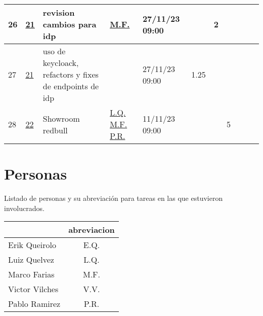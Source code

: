 \documentclass{article}
\begin{document}
\begin{longtable}{|m{0.5cm}|m{1.2cm}|p{5cm}|m{1.5cm}|m{1.5cm}||c|c|c|c|c|c|    |}
                 \label{26}26  &  \hyperref[21]{\color{blue}21}  & revision cambios para idp &  
                  \hyperref[M.F.]{\color{blue}M.F.}  & 27/11/23 09:00  &  & 2 &  &  &  & \\ \hline 

                 \label{27}27  &  \hyperref[21]{\color{blue}21}  & uso de keycloack, refactors y fixes de endpoints de idp &  
                 & 27/11/23 09:00  & 1.25 &  &  &  &  & \\ \hline 

                 \label{28}28  &  \hyperref[22]{\color{blue}22}  & Showroom redbull &  
                  \hyperref[L.Q.]{\color{blue}L.Q.} \newline  \hyperref[M.F.]{\color{blue}M.F.} \newline  \hyperref[P.R.]{\color{blue}P.R.}  & 11/11/23 09:00  &  &  & 5 &  &  & \\ \hline 

    \end{longtable} 
 \newpage
\section{Personas}
Listado de personas y su abreviación para tareas en las que estuvieron involucrados.
\begin{table}[htbp]
    \centering
    \begin{tabular}{|p{6cm}|c|}
        \hline
        \centering{\textbf{Nombre}} & \textbf{abreviacion} \\ \hline
        Erik Queirolo &  \label{E.Q.}E.Q.  \\ \hline
        Luiz Quelvez &  \label{L.Q.}L.Q.  \\ \hline
        Marco Farias &  \label{M.F.}M.F.  \\ \hline
        Victor Vilches &  \label{V.V.}V.V.  \\ \hline
        Pablo Ramirez &  \label{P.R.}P.R.  \\ \hline
    \end{tabular}
\end{table} 
 
\end{document}
